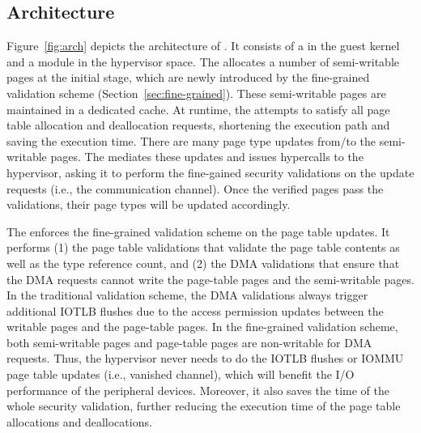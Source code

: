 \subsection{\name Architecture}
Figure~\ref{fig:arch} depicts the architecture of \name. It consists of a \cache in the guest kernel and a \name module in the hypervisor space.
The \cache allocates a number of semi-writable pages at the initial stage,  which are newly introduced by the fine-grained validation scheme (Section~\ref{sec:fine-grained}).
These semi-writable pages are maintained in a dedicated cache.
At runtime, the \cache attempts to satisfy all page table allocation and deallocation requests, shortening the execution path and saving the execution time.
There are many page type updates from/to the semi-writable pages.
The \cache mediates these updates and issues hypercalls to the hypervisor, asking it to perform the fine-gained security validations on the update requests (i.e., the communication channel).
Once the verified pages pass the validations, their page types will be updated accordingly.

The \module enforces the fine-grained validation scheme on the page table updates.
It performs (1) the page table validations that validate the page table contents as well as the type reference count, and (2) the DMA validations that ensure that the DMA requests cannot write the page-table pages and the semi-writable pages.
In the traditional validation scheme, the DMA validations always trigger additional IOTLB flushes due to the access permission updates between the writable pages and the page-table pages.
In the fine-grained validation scheme, both semi-writable pages and page-table pages are non-writable for DMA requests.
Thus, the hypervisor never needs to do the IOTLB flushes or IOMMU page table updates (i.e., vanished channel), which will benefit the I/O performance of the peripheral devices.
Moreover, it also saves the time of the whole security validation, further reducing the execution time of the page table allocations and deallocations.


